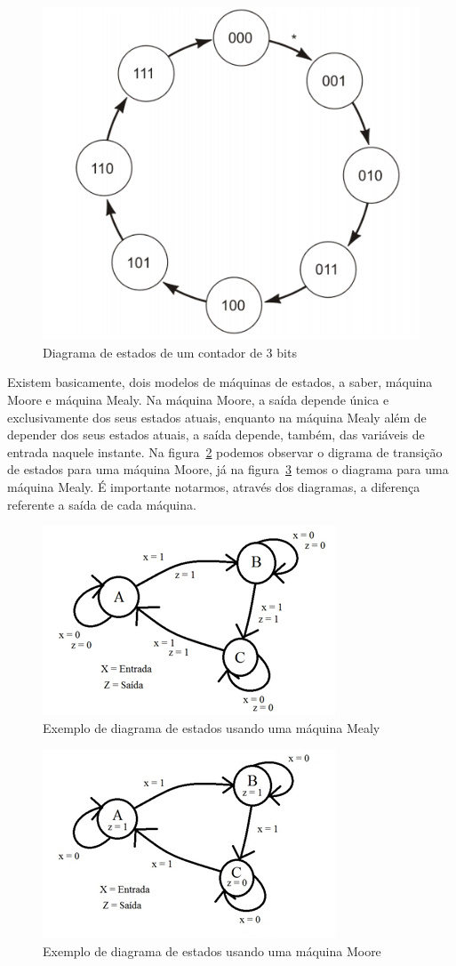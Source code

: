 \documentclass[12pt]{article}
\begin{document}
\begin{figure}[!htbp]
\centering
\includegraphics[width=.4\textwidth]{img/p4/diagrama-estados.png}
\caption{Diagrama de estados de um contador de 3 bits\cite{floyd2011digital}}
\label{fig:diagrama}
\end{figure}

Existem basicamente, dois modelos de máquinas de estados, a saber, máquina Moore e máquina Mealy. Na máquina Moore, a saída depende única e exclusivamente dos seus estados atuais, enquanto na máquina Mealy além de depender dos seus estados atuais, a saída depende, também, das variáveis de entrada naquele instante. Na figura~\ref{fig:diagrama-mealy}  podemos observar  o digrama de transição de estados para uma máquina Moore, já na figura~\ref{fig:diagrama-moore} temos o diagrama para uma máquina Mealy. É importante notarmos, através dos diagramas, a diferença referente a saída de cada máquina.   

\begin{figure}[!htbp]
\centering
\includegraphics[width=.5\textwidth]{img/p4/fig2MaquinaMealy.png}
\caption{Exemplo de diagrama de estados usando uma máquina Mealy}
\label{fig:diagrama-mealy}
\end{figure}

\begin{figure}[!htbp]
\centering
\includegraphics[width=.5\textwidth]{img/p4/fig3MaquinaMoore.png}
\caption{Exemplo de diagrama de estados usando uma máquina Moore}
\label{fig:diagrama-moore}
\end{figure}
\end{document}
